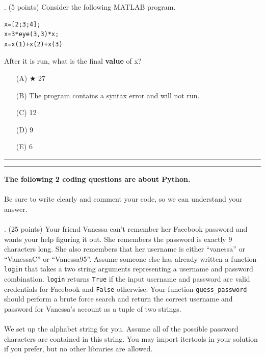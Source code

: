 \documentclass{article}
\newcounter{question}
\begin{document}
\newpage
{}. (5 points)
Consider the following MATLAB program.
\begin{verbatim}
x=[2;3;4];
x=3*eye(3,3)*x;
x=x(1)+x(2)+x(3)
\end{verbatim}
After it is run, what is the final \textbf{value} of x?


\begin{enumerate}
\item[(A)] $\bigstar$ 
27

\item[(B)]
The program contains a syntax error and will not run.

\item[(C)]
12

\item[(D)]
9

\item[(E)]
6

\end{enumerate}

\vspace*{2em}
\hrule
\vspace{2em}

\vspace{2em}
\hrule height 2pt


\pagebreak \noindent \textbf{The following 2 coding questions are about Python.}
\\\\
\noindent Be sure to write clearly and comment your code, so we can understand your answer.
\\\\



\newpage
{}. (25 points)
Your friend Vanessa can't remember her Facebook password and wants your help figuring it out. She remembers the password is exactly 9 characters long. She also remembers that her username is either ``vanessa'' or ``VanessaC'' or ``Vanessa95''. Assume someone else has already written a function \verb|login| that takes a two string arguments representing a username and password combination. \verb|login| returns  \verb|True| if the input username and password are valid credentials for Facebook and \verb|False| otherwise. Your function  \verb|guess_password| should perform a brute force search and return the correct username and password for Vanessa's account as a tuple of two strings.
\\\\
\noindent We set up the alphabet string for you. Assume all of the possible password characters are contained in this string. You may import itertools in your solution if you prefer, but no other libraries are allowed.
\end{document}
